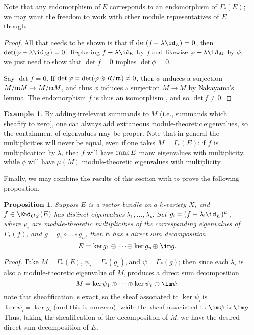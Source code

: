 \documentclass[12pt]{article}
\let\wtilde\widetilde
\def\OO{\mathcal O}
\theoremstyle{theorem}
\numberwithin{thm}{section}
\newtheorem{prop}[thm]{Proposition}
\theoremstyle{definition}
\newtheorem{exa}[thm]{Example}
\begin{document}
Note that any endomorphism of $E$ corresponds to an endomorphism of $\Gamma_*(E)$; we may want the freedom to work with other module representatives of $E$ though.

\begin{proof}
  All that needs to be shown is that if $\det(f-\lambda \id_E) =0$, then $\det(\phi-\lambda \id_M)=0$. Replacing $f-\lambda \id_E$ by $f$ and likewise $\phi-\lambda\id_M$ by $\phi$,
  we just need to show that $\det f = 0$ implies $\det\phi = 0$.

  Say $\det f = 0$. If $\det\varphi = \det(\varphi\otimes R/\mathfrak m)\neq 0$, then $\phi$ induces a surjection $M/\mathfrak m M\to M/\mathfrak m M$, and thus $\phi$ induces a surjection $M\to M$ by Nakayama's lemma. The endomorphism $f$ is thus an isomorphism \cite[Corollary~4.4]{Eisenbud95}, and so $\det f\neq 0$.
\end{proof}

\begin{exa}
  By adding irrelevant summands to $M$ (i.e., summands which sheafify to zero), one can always add extraneous module-theoretic eigenvalues, so the containment of eigenvalues may be proper.
  Note that in general the multiplicities will never be equal, even if one takes $M=\Gamma_*(E)$: if $f$ is multiplication by $\lambda$, then $f$ will have $\operatorname{rank} E$ many eigenvalues with multiplicity, while $\phi$ will have $\mu(M)$ module-theoretic eigenvalues with multiplicity.
\end{exa}

Finally, we may combine the results of this section with  to prove the following proposition.

\begin{prop}
  Suppose $E$ is a vector bundle on a $k$-variety $X$, and $f\in\End_{\OO_X}(E)$ has distinct eigenvalues $\lambda_1,\dots,\lambda_n$. Set $g_i = (f - \lambda_i\id_E)^{\mu_i}$, where $\mu_i$ are module-theoretic multiplicities of the corresponding eigenvalues of $\Gamma_*(f)$, and $g = g_1\circ\dots\circ g_n$, then $E$ has a direct sum decomposition
  \[ E = \ker g_1 \oplus \dots \oplus \ker g_n \oplus \im g. \]
\end{prop}
\begin{proof}
  Take $M = \Gamma_*(E)$, $\psi_i = \Gamma_*(g_i)$, and $\psi = \Gamma_*(g)$; then since each $\lambda_i$ is also a module-theoretic eigenvalue of $M$,  produces a direct sum decomposition
  \[ M = \ker\psi_1 \oplus \cdots \oplus \ker\psi_n \oplus \im\psi; \]
note that sheafification is exact, so the sheaf associated to $\ker \psi_i$ is $\ker \wtilde \psi_i = \ker g_i$ (and this is nonzero), while the sheaf associated to $\im \psi $ is $\im g$.
Thus, taking the sheafification of the decomposition of $M$,
we have the desired direct sum decomposition of $E$.
\end{proof}
\end{document}

